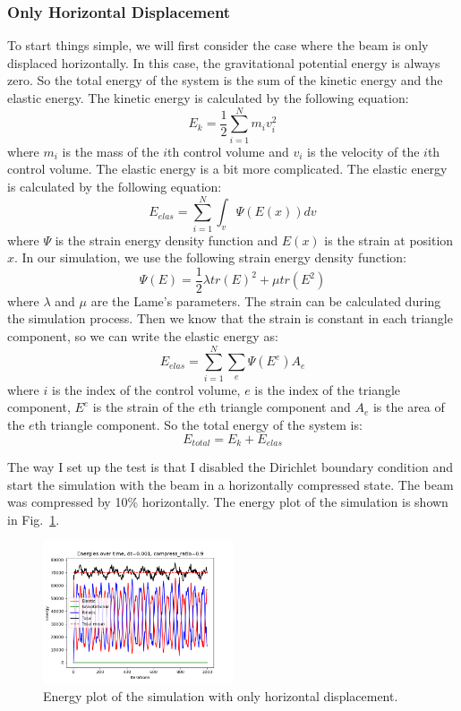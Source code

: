 \documentclass[acmtog]{acmart}
\begin{document}
\subsubsection{Only Horizontal Displacement}
To start things simple, we will first consider the case where the beam is only displaced horizontally. In this case, the gravitational potential energy is always zero. So the total energy of the system is the sum of the kinetic energy and the elastic energy. The kinetic energy is calculated by the following equation:
\begin{equation*}
E_k = \frac{1}{2} \sum_{i=1}^{N} m_i v_i^2
\end{equation*}
where $m_i$ is the mass of the $i$th control volume and $v_i$ is the velocity of the $i$th control volume. The elastic energy is a bit more complicated. The elastic energy is calculated by the following equation:
\begin{equation*}
E_{elas} = \sum_{i=1}^{N} \int_v \Psi(E(x)) dv
\end{equation*}
where $\Psi$ is the strain energy density function and $E(x)$ is the strain at position $x$. In our simulation, we use the following strain energy density function:
\begin{equation*}
\Psi(E) = \frac{1}{2} \lambda tr(E)^2 + \mu tr(E^2)
\end{equation*}
where $\lambda$ and $\mu$ are the Lame's parameters. The strain can be calculated during the simulation process. Then we know that the strain is constant in each triangle component, so we can write the elastic energy as:
\begin{equation*}
E_{elas} = \sum_{i=1}^{N} \sum_{e} \Psi(E^e) A_e
\end{equation*}
where $i$ is the index of the control volume, $e$ is the index of the triangle component, $E^e$ is the strain of the $e$th triangle component and $A_e$ is the area of the $e$th triangle component. So the total energy of the system is:
\begin{equation*}
E_{total} = E_k + E_{elas}
\end{equation*}

The way I set up the test is that I disabled the Dirichlet boundary condition and start the simulation with the beam in a horizontally compressed state. The beam was compressed by 10\% horizontally. The energy plot of the simulation is shown in Fig.~\ref{fig:godly}.

\begin{figure}[H]
  \centering
  \includegraphics[width=0.5\textwidth]{images/godly.png}
  \caption{Energy plot of the simulation with only horizontal displacement.}
  \label{fig:godly}
\end{figure}
\end{document}
